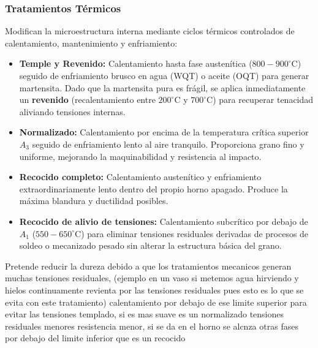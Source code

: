 \subsubsection{Tratamientos Térmicos}
Modifican la microestructura interna mediante ciclos térmicos controlados de calentamiento, mantenimiento y enfriamiento:
\begin{itemize}
    \item \textbf{Temple y Revenido:} Calentamiento hasta fase austenítica ($800 - 900^\circ\text{C}$) seguido de enfriamiento brusco en agua (WQT) o aceite (OQT) para generar martensita. Dado que la martensita pura es frágil, se aplica inmediatamente un \textbf{revenido} (recalentamiento entre $200^\circ\text{C}$ y $700^\circ\text{C}$) para recuperar tenacidad aliviando tensiones internas.
    \item \textbf{Normalizado:} Calentamiento por encima de la temperatura crítica superior $A_3$ seguido de enfriamiento lento al aire tranquilo. Proporciona grano fino y uniforme, mejorando la maquinabilidad y resistencia al impacto.
    \item \textbf{Recocido completo:} Calentamiento austenítico y enfriamiento extraordinariamente lento dentro del propio horno apagado. Produce la máxima blandura y ductilidad posibles.
    \item \textbf{Recocido de alivio de tensiones:} Calentamiento subcrítico por debajo de $A_1$ ($550 - 650^\circ\text{C}$) para eliminar tensiones residuales derivadas de procesos de soldeo o mecanizado pesado sin alterar la estructura básica del grano.
\end{itemize}
Pretende reducir la dureza debido a que los tratamientos mecanicos generan muchas tensiones residuales, (ejemplo en un vaso si metemos agua hirviendo y hielos continuamente revienta por las tensiones residuales pues esto es lo que se evita con este tratamiento)
calentamiento por debajo de ese limite superior para evitar las tensiones templado, si es mas suave es un normalizado tensiones residuales menores resistencia menor, si se da en el horno se alcnza otras fases por debajo del limite inferior que es un recocido
